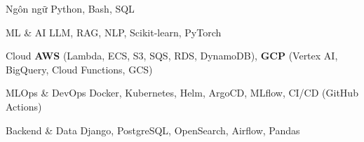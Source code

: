 

\begin{cvskills}

  \cvskill
    {Ngôn ngữ} %
    {Python, Bash, SQL} %

  \cvskill
    {ML \& AI} %
    {LLM, RAG, NLP, Scikit-learn, PyTorch} %

  \cvskill
    {Cloud} %
    {\textbf{AWS} (Lambda, ECS, S3, SQS, RDS, DynamoDB), \textbf{GCP} (Vertex AI, BigQuery, Cloud Functions, GCS)} %

  \cvskill
    {MLOps \& DevOps} %
    {Docker, Kubernetes, Helm, ArgoCD, MLflow, CI/CD (GitHub Actions)} %

  \cvskill
    {Backend \& Data} %
    {Django, PostgreSQL, OpenSearch, Airflow, Pandas} %

\end{cvskills}
